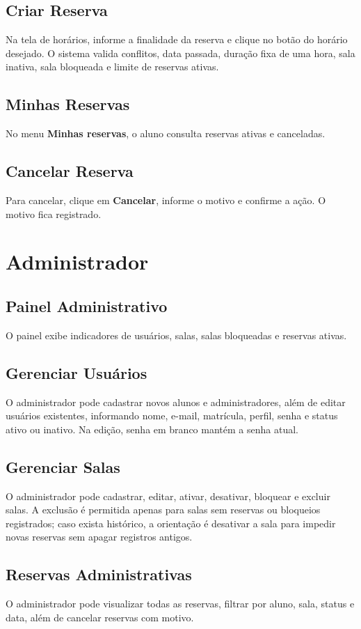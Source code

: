 \documentclass[12pt,a4paper]{article}
\begin{document}
\subsection{Criar Reserva}
Na tela de horários, informe a finalidade da reserva e clique no botão do horário desejado. O sistema valida conflitos, data passada, duração fixa de uma hora, sala inativa, sala bloqueada e limite de reservas ativas.

\subsection{Minhas Reservas}
No menu \textbf{Minhas reservas}, o aluno consulta reservas ativas e canceladas.

\subsection{Cancelar Reserva}
Para cancelar, clique em \textbf{Cancelar}, informe o motivo e confirme a ação. O motivo fica registrado.

\section{Administrador}
\subsection{Painel Administrativo}
O painel exibe indicadores de usuários, salas, salas bloqueadas e reservas ativas.

\subsection{Gerenciar Usuários}
O administrador pode cadastrar novos alunos e administradores, além de editar usuários existentes, informando nome, e-mail, matrícula, perfil, senha e status ativo ou inativo. Na edição, senha em branco mantém a senha atual.

\subsection{Gerenciar Salas}
O administrador pode cadastrar, editar, ativar, desativar, bloquear e excluir salas. A exclusão é permitida apenas para salas sem reservas ou bloqueios registrados; caso exista histórico, a orientação é desativar a sala para impedir novas reservas sem apagar registros antigos.

\subsection{Reservas Administrativas}
O administrador pode visualizar todas as reservas, filtrar por aluno, sala, status e data, além de cancelar reservas com motivo.
\end{document}
